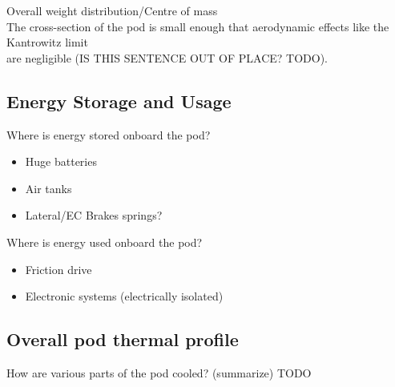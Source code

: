 \documentclass[main.tex]{subfiles}
\begin{document}
\begin{flushleft}
Overall weight distribution/Centre of mass\\
The cross-section of the pod is small enough that aerodynamic effects like the Kantrowitz limit\\
are negligible (IS THIS SENTENCE OUT OF PLACE? TODO).\\

\subsection{Energy Storage and Usage}
Where is energy stored onboard the pod?
\begin{itemize}
    \item Huge batteries
    \item Air tanks
    \item Lateral/EC Brakes springs?
\end{itemize}
Where is energy used onboard the pod?
\begin{itemize}
    \item Friction drive
    \item Electronic systems (electrically isolated)
\end{itemize}

\subsection{Overall pod thermal profile}
How are various parts of the pod cooled? (summarize) TODO


\end{flushleft}
\end{document}
